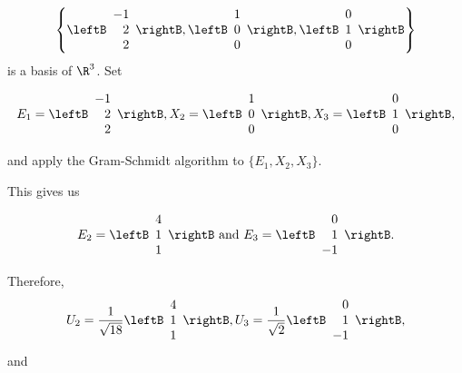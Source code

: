 \begin{solution}
\[ \left\{ \leftB\begin{array}{r} -1 \\ 2 \\ 2 \end{array}\rightB,
\leftB\begin{array}{r} 1 \\ 0 \\ 0 \end{array}\rightB,
\leftB\begin{array}{r} 0 \\ 1 \\ 0 \end{array}\rightB\right\}\]
is a basis of $\R^3$.  Set

\[ E_1 = \leftB\begin{array}{r} -1 \\ 2 \\ 2 \end{array}\rightB,
X_2 = \leftB\begin{array}{r} 1 \\ 0 \\ 0 \end{array}\rightB,
X_3 =\leftB\begin{array}{r} 0 \\ 1 \\ 0 \end{array}\rightB,\]

and apply the Gram-Schmidt algorithm to
$\{ E_1, X_2, X_3\}$.

This gives us

\[ E_2 = \leftB\begin{array}{r} 4 \\ 1 \\ 1 \end{array}\rightB
\mbox{ and }
E_3 = \leftB\begin{array}{r} 0 \\ 1 \\ -1 \end{array}\rightB.\]

Therefore,
\[ U_2 = \frac{1}{\sqrt{18}}
 \leftB\begin{array}{r} 4 \\ 1 \\ 1 \end{array}\rightB,
U_3 = \frac{1}{\sqrt 2}
\leftB\begin{array}{r} 0 \\ 1 \\ -1 \end{array}\rightB,\]
and


\end{solution}

